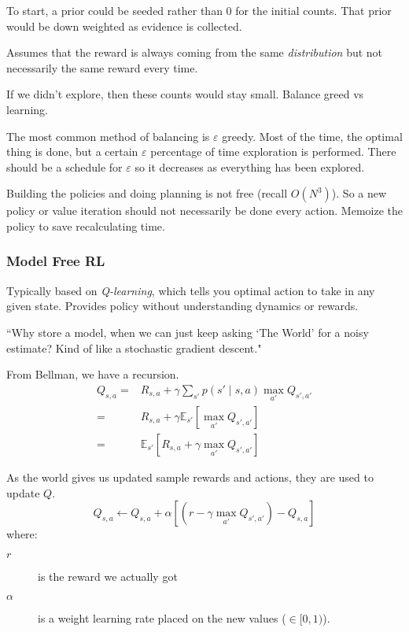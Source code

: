 \documentclass[11pt, oneside]{article}   	%
\begin{document}
To start, a prior could be seeded rather than 0 for the initial counts. That prior would be down weighted as evidence is collected.

Assumes that the reward is always coming from the same \emph{distribution} but not necessarily the same reward every time.

If we didn't explore, then these counts would stay small. Balance greed vs learning.

The most common method of balancing is $\varepsilon$ greedy. Most of the time, the optimal thing is done, but a certain $\varepsilon$ percentage of time exploration is performed. There should be a schedule for $\varepsilon$ so it decreases as everything has been explored.

Building the policies and doing planning is not free (recall $O(N^3)$). So a new policy or value iteration should not necessarily be done every action. Memoize the policy to save recalculating time.

\subsubsection{Model Free RL}

Typically based on \emph{Q-learning}, which tells you optimal action to take in any given state. Provides policy without understanding dynamics or rewards.

``Why store a model, when we can just keep asking `The World' for a noisy estimate? Kind of like a stochastic gradient descent."

From Bellman, we have a recursion.
\begin{align}
Q_{s,a} = &R_{s,a} + \gamma \sum_{s'} p(s' \mid s,a) \max_{a'} Q_{s',a'}\\
	      = & R_{s,a} + \gamma \mathbb{E}_{s'} \left[ \max_{a'} Q_{s',a'}\right]\\
	      = & \mathbb{E}_{s'} \left[ R_{s,a} + \gamma \max_{a'} Q_{s',a'}\right]
\end{align}

As the world gives us updated sample rewards and actions, they are used to update $Q$.
\[
	Q_{s,a} \leftarrow Q_{s,a} + \alpha \left[ (r - \gamma \max_{a'} Q_{s',a'}) - Q_{s,a}\right]
\]
where:
\begin{description}
	\item[$r$] is the reward we actually got
	\item[$\alpha$] is a weight learning rate placed on the new values ($\in [0,1)$).
\end{description}
\end{document}
